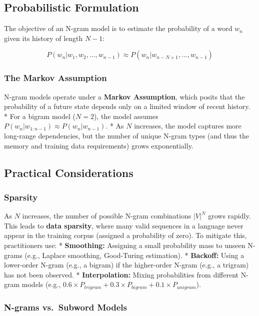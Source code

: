 \documentclass[
  italian,
  11pt,
]{article}
\begin{document}
\subsection{Probabilistic Formulation}\label{probabilistic-formulation}

The objective of an N-gram model is to estimate the probability of a
word \(w_n\) given its history of length \(N-1\):

\[P(w_n | w_1, w_2, \dots, w_{n-1}) \approx P(w_n | w_{n-N+1}, \dots, w_{n-1})\]

\subsubsection{The Markov Assumption}\label{the-markov-assumption}

N-gram models operate under a \textbf{Markov Assumption}, which posits
that the probability of a future state depends only on a limited window
of recent history. * For a bigram model (\(N=2\)), the model assumes
\(P(w_n | w_{1:n-1}) \approx P(w_n | w_{n-1})\). * As \(N\) increases,
the model captures more long-range dependencies, but the number of
unique N-gram types (and thus the memory and training data requirements)
grows exponentially.

\subsection{Practical Considerations}\label{practical-considerations}

\subsubsection{Sparsity}\label{sparsity}

As \(N\) increases, the number of possible N-gram combinations \(|V|^N\)
grows rapidly. This leads to \textbf{data sparsity}, where many valid
sequences in a language never appear in the training corpus (assigned a
probability of zero). To mitigate this, practitioners use: *
\textbf{Smoothing:} Assigning a small probability mass to unseen N-grams
(e.g., Laplace smoothing, Good-Turing estimation). * \textbf{Backoff:}
Using a lower-order N-gram (e.g., a bigram) if the higher-order N-gram
(e.g., a trigram) has not been observed. * \textbf{Interpolation:}
Mixing probabilities from different N-gram models (e.g.,
\(0.6 \times P_{trigram} + 0.3 \times P_{bigram} + 0.1 \times P_{unigram}\)).

\subsubsection{N-grams vs.~Subword
Models}\label{n-grams-vs.-subword-models}
\end{document}
